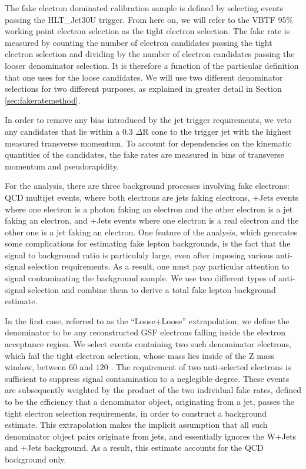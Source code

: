 \documentclass{cmspaper}
\begin{document}
The fake electron dominated calibration sample is defined by selecting events passing the HLT\_Jet30U trigger. From here on, we will refer to the VBTF 95\% working point electron selection as the tight electron selection. The fake rate is measured by counting the number of electron candidates passing the tight electron selection and dividing by the number of electron candidates passing the looser denominator selection. It is therefore a function of the particular definition that one uses for the loose candidates. We will use two different denominator selections for two different purposes, as explained in greater detail in Section \ref{sec:fakeratemethod}. 

In order to remove any bias introduced by the jet trigger requirements, we veto any candidates that lie within a 0.3 $\Delta$R cone to the trigger jet with the highest measured transverse momentum. To account for dependencies on the kinematic quantities of the candidates, the fake rates are measured in bins of transverse momentum and pseudorapidity. 




\label{sec:fakeratemethod}
For the \Z\To\EE analysis, there are three background processes involving fake electrons: QCD multijet events, where both electrons are jets faking electrons, \GAM+Jets events where one electron is a photon faking an electron and the other electron is a jet faking an electron, and \W+Jets events where one electron is a real electron and the other one is a jet faking an electron. One feature of the \Z\To\EE analysis, which generates some complications for estimating fake lepton backgrounds, is the fact that the signal to background ratio is particulaly large, even after imposing various anti-signal selection requirements. As a result, one must pay particular attention to signal contaminating the background sample. We use two different types of anti-signal selection and combine them to derive a total fake lepton background estimate.

In the first case, referred to as the ``Loose+Loose'' extrapolation, we define the denominator to be any reconstructed GSF electrons falling inside the electron acceptance region. We select events containing two such denominator electrons, which fail the tight electron selection, whose mass lies inside of the Z mass window, between $60$ \GeVcc and $120$ \GeVcc. The requirement of two anti-selected electrons is sufficient to suppress signal contamination to a neglegible degree. These events are subsequently weighted by the product of the two individual fake rates, defined to be the efficiency that a denominator object, originating from a jet, passes the tight electron selection requirements, in order to construct a background estimate. This extrapolation makes the implicit assumption that all such denominator object pairs originate from jets, and essentially ignores the W+Jets and \GAM+Jets background. As a result, this estimate accounts for the QCD background only.
\end{document}
